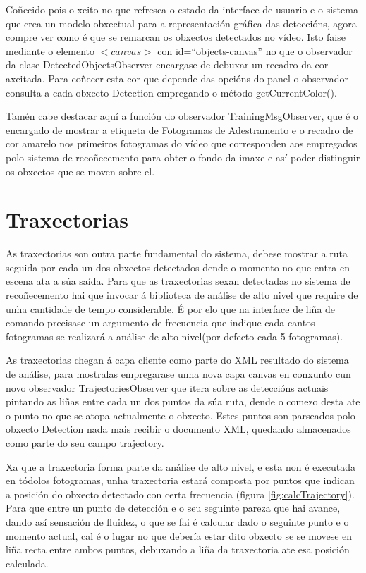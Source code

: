     Coñecido pois o xeito no que refresca o estado da interface de usuario e o sistema que crea un 
    modelo obxectual para a representación gráfica das deteccións, agora compre ver como é que se 
    remarcan os obxectos detectados no vídeo. Isto faise mediante o elemento $<canvas>$ con
    id=``objects-canvas'' no que o observador da clase DetectedObjectsObserver encargase de debuxar
    un recadro da cor axeitada. Para coñecer esta cor que depende das opcións do panel o observador
    consulta a cada obxecto Detection empregando o método getCurrentColor().
    
    Tamén cabe destacar aquí a función do observador TrainingMsgObserver, que é o encargado de 
    mostrar a etiqueta de Fotogramas de Adestramento e o recadro de cor amarelo nos primeiros 
    fotogramas do vídeo que corresponden aos empregados polo sistema de recoñecemento para obter o 
    fondo da imaxe e así poder distinguir os obxectos que se moven sobre el.
    
\section{Traxectorias}

    As traxectorias son outra parte fundamental do sistema, debese mostrar a ruta seguida por 
    cada un dos obxectos detectados dende o momento no que entra en escena ata a súa saída. Para 
    que as traxectorias sexan detectadas no sistema de recoñecemento hai que invocar á biblioteca 
    de análise de alto nivel que require de unha cantidade de tempo considerable. É por elo que na 
    interface de liña de comando precisase un argumento de frecuencia que indique cada cantos 
    fotogramas se realizará a análise de alto nivel(por defecto cada 5 fotogramas).
    
    As traxectorias chegan á capa cliente como parte do XML resultado do sistema de análise, para 
    mostralas empregarase unha nova capa canvas en conxunto cun novo observador 
    TrajectoriesObserver que itera sobre as deteccións actuais pintando as liñas entre cada un dos
    puntos da súa ruta, dende o comezo desta ate o punto no que se atopa actualmente o obxecto. 
    Estes puntos son parseados polo obxecto Detection nada mais recibir o documento XML, quedando
    almacenados como parte do seu campo trajectory.
    
    Xa que a traxectoria forma parte da análise de alto nivel, e esta 
    non é executada en tódolos fotogramas, unha traxectoria estará composta por puntos que indican a
    posición do obxecto detectado con certa frecuencia (figura \ref{fig:calcTrajectory}).
    Para que entre un punto de detección e o seu
    seguinte pareza que hai avance, dando así sensación de fluidez, o que se fai é calcular dado o
    seguinte punto e o momento actual, cal é o lugar no que debería estar dito obxecto se se movese
    en liña recta entre ambos puntos, debuxando a liña da traxectoria ate esa posición calculada.
    
